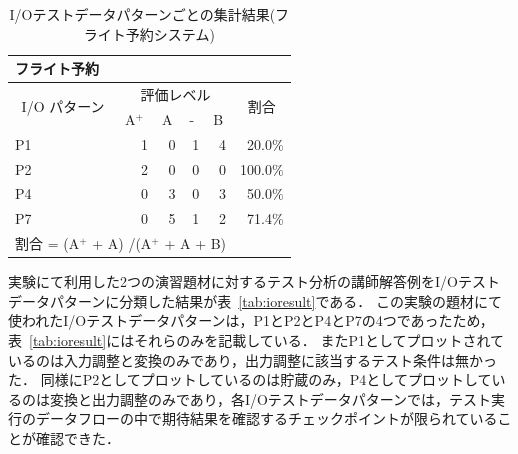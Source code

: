 \begin{table}[htbp]
  \centering
\caption{I/Oテストデータパターンごとの集計結果(フライト予約システム)}
    \begin{tabular}{lllllr}
    フライト予約 &       &       &       &       &  \bigstrut[b]\\
    \hline
    \multicolumn{1}{|c|}{\multirow{2}[4]{*}{I/O パターン}} & \multicolumn{4}{c|}{評価レベル}    & \multicolumn{1}{c|}{\multirow{2}[4]{*}{割合}} \bigstrut\\
\cline{2-5}    \multicolumn{1}{|c|}{} & \multicolumn{1}{l|}{A${}^\text{+}$ } & \multicolumn{1}{l|}{A} & \multicolumn{1}{l|}{-} & \multicolumn{1}{l|}{B} & \multicolumn{1}{c|}{} \bigstrut\\
    \hline
    \hline
    \multicolumn{1}{|l|}{P1} & \multicolumn{1}{r|}{1} & \multicolumn{1}{r|}{0} & \multicolumn{1}{r|}{1} & \multicolumn{1}{r|}{4} & \multicolumn{1}{r|}{20.0\%} \bigstrut\\
    \hline
    \multicolumn{1}{|l|}{P2} & \multicolumn{1}{r|}{2} & \multicolumn{1}{r|}{0} & \multicolumn{1}{r|}{0} & \multicolumn{1}{r|}{0} & \multicolumn{1}{r|}{100.0\%} \bigstrut\\
    \hline
    \multicolumn{1}{|l|}{P4} & \multicolumn{1}{r|}{0} & \multicolumn{1}{r|}{3} & \multicolumn{1}{r|}{0} & \multicolumn{1}{r|}{3} & \multicolumn{1}{r|}{50.0\%} \bigstrut\\
    \hline
    \multicolumn{1}{|l|}{P7} & \multicolumn{1}{r|}{0} & \multicolumn{1}{r|}{5} & \multicolumn{1}{r|}{1} & \multicolumn{1}{r|}{2} & \multicolumn{1}{r|}{71.4\%} \bigstrut\\
    \hline
    \multicolumn{5}{l}{割合 = (A${}^\text{+}$   +  A) /(A${}^\text{+}$   +  A + B) } &  \bigstrut[t]\\
    \end{tabular}%
\label{tab:D-4-tab20}%
\end{table}%


実験にて利用した2つの演習題材に対するテスト分析の講師解答例をI/Oテストデータパターンに分類した結果が表~\ref{tab:ioresult}である．
この実験の題材にて使われたI/Oテストデータパターンは，P1とP2とP4とP7の4つであったため，表~\ref{tab:ioresult}にはそれらのみを記載している．
またP1としてプロットされているのは入力調整と変換のみであり，出力調整に該当するテスト条件は無かった．
同様にP2としてプロットしているのは貯蔵のみ，P4としてプロットしているのは変換と出力調整のみであり，各I/Oテストデータパターンでは，テスト実行のデータフローの中で期待結果を確認するチェックポイントが限られていることが確認できた．


